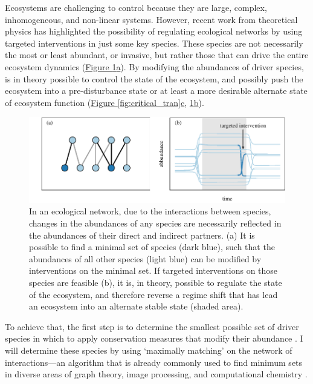 \documentclass[a4paper]{article}
\begin{document}
Ecosystems are challenging to control because they are large, complex, inhomogeneous, and non-linear systems.
However, recent work from theoretical physics has highlighted the possibility of regulating ecological networks by using targeted interventions in just some key species.
These species are not necessarily the most or least abundant, or invasive, but rather those that can drive the entire ecosystem dynamics \cite{Liu2011} (\hyperref[fig:control_net]{Figure \ref{fig:control_net}a}).
By modifying the abundances of driver species, is in theory possible to control the state of the ecosystem, and possibly push the ecosystem into a pre-disturbance state or at least a more desirable alternate state of ecosystem function (\hyperref[fig:critical_tran]{Figure \ref{fig:critical_tran}c}, \hyperref[fig:control_net]{\ref{fig:control_net}b}).

\begin{figure}
  \centering
  \includegraphics{control_net}
  \caption{
  \label{fig:control_net}
  In an ecological network, due to the interactions between species, changes in the abundances of any species are necessarily reflected in the abundances of their direct and indirect partners.
  (a) It is possible to find a minimal set of species (dark blue), such that the abundances of all other species (light blue) can be modified by interventions on the minimal set.
  If targeted interventions on those species are feasible (b), it is, in theory, possible to regulate the state of the ecosystem, and therefore reverse a regime shift that has lead an ecosystem into an alternate stable state (shaded area).
  }
\end{figure}

To achieve that, the first step is to determine the smallest possible set of driver species in which to apply conservation measures that modify their abundance \cite{Liu2011, Isbell2013}.
I will determine these species by using `maximally matching' on the network of interactions---an algorithm that is already commonly used to find minimum sets in diverse areas of graph theory, image processing, and computational chemistry \cite{Hopcroft1973,Neumann2010}.
\end{document}
